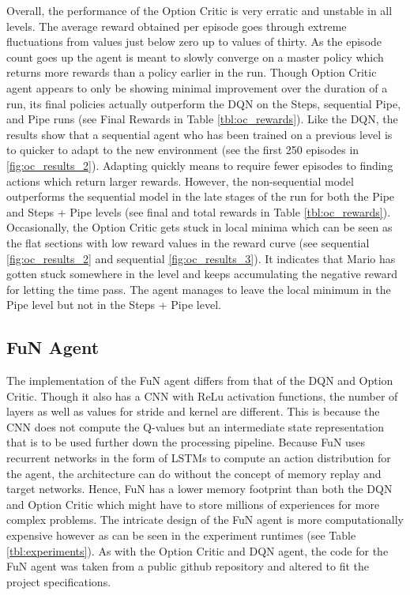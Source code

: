 \documentclass[notitlepage,a4paper,11pt]{article}
\begin{document}
Overall, the performance of the Option Critic is very erratic and unstable in all levels. The average reward obtained per episode goes through extreme fluctuations from values just below zero up to values of thirty. As the episode count goes up the agent is meant to slowly converge on a master policy which returns more rewards than a policy earlier in the run. Though Option Critic agent appears to only be showing minimal improvement over the duration of a run, its final policies actually outperform the DQN on the Steps, sequential Pipe, and Pipe runs (see Final Rewards in Table \ref{tbl:oc_rewards}). Like the DQN, the results show that a sequential agent who has been trained on a previous level is to quicker to adapt to the new environment (see the first 250 episodes in \ref{fig:oc_results_2}). Adapting quickly means to require fewer episodes to finding actions which return larger rewards. However, the non-sequential model outperforms the sequential model in the late stages of the run for both the Pipe and Steps + Pipe levels (see final and total rewards in Table \ref{tbl:oc_rewards}). Occasionally, the Option Critic gets stuck in local minima which can be seen as the flat sections with low reward values in the reward curve (see sequential \ref{fig:oc_results_2} and sequential \ref{fig:oc_results_3}). It indicates that Mario has gotten stuck somewhere in the level and keeps accumulating the negative reward for letting the time pass. The agent manages to leave the local minimum in the Pipe level but not in the Steps + Pipe level.



\subsection{FuN Agent}\label{fun_experiment}
The implementation of the FuN agent differs from that of the DQN and Option Critic. Though it also has a CNN with ReLu activation functions, the number of layers as well as values for stride and kernel are different. This is because the CNN does not compute the Q-values but an intermediate state representation that is to be used further down the processing pipeline. Because FuN uses recurrent networks in the form of LSTMs to compute an action distribution for the agent, the architecture can do without the concept of memory replay and target networks. Hence, FuN has a lower memory footprint than both the DQN and Option Critic which might have to store millions of experiences for more complex problems. The intricate design of the FuN agent is more computationally expensive however as can be seen in the experiment runtimes (see Table \ref{tbl:experiments}). As with the Option Critic and DQN agent, the code for the FuN agent was taken from a public github repository \cite{fun_github} and altered to fit the project specifications.
\end{document}
